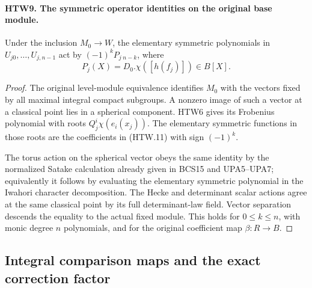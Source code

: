 \documentclass[11pt,a4paper]{article}
\numberwithin{equation}{section}
\theoremstyle{remark}\newtheorem{remark}[theorem]{Remark}
\begin{document}
\paragraph{HTW9. The symmetric operator identities on the original base module.}
\label{claim:HTW9}
Under the inclusion \(M_0\to W\), the elementary symmetric
polynomials in \(U_{j0},\ldots,U_{j,n-1}\) act by
\((-1)^kP_j{}_{\,n-k}\), where
\[
 P_j(X)=D_0.\chi([h(f_j)])\in B[X].
 \tag{HTW.11}
\]
\begin{proof}
The original level-module equivalence identifies \(M_0\)
with the vectors fixed by all maximal integral compact
subgroups.  A nonzero image of such a vector at a
classical point lies in a spherical component.
HTW6 gives its Frobenius polynomial with roots
\(Q_j^i\chi(e_i(x_j))\).  The elementary symmetric
functions in those roots are the coefficients in
(HTW.11) with sign \((-1)^k\).

The torus action on the spherical vector obeys the same
identity by the normalized Satake calculation already
given in BCS15 and UPA5--UPA7; equivalently it follows
by evaluating the elementary symmetric polynomial in
the Iwahori character decomposition.  The Hecke and
determinant scalar actions agree at the same classical
point by its full determinant-law field.  Vector
separation descends the equality to the actual fixed
module.  This holds for \(0\le k\le n\), with monic
degree \(n\) polynomials, and for the original
coefficient map \(\beta:R\to B\).
\end{proof}

\subsection{Integral comparison maps and the exact correction factor}

\end{document}
